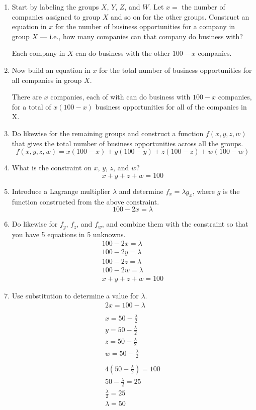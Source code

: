 \documentclass[letterpaper,12pt,fleqn]{article}
\renewcommand{\l}{\lambda}
\begin{document}
\begin{enumerate}[label={\alph*)}]
\item Start by labeling the groups \(X\), \(Y\), \(Z\), and \(W\).  Let \(x=\) the number of companies assigned to
  group \(X\) and so on for the other groups.  Construct an equation in \(x\) for the number of business
  opportunities for a company in group \(X\) --- i.e., how many companies can that company do business with?

  Each company in \(X\) can do business with the other \(100-x\) companies.
  
\item Now build an equation in \(x\) for the total number of business opportunities for all companies in group
  \(X\).

  There are \(x\) companies, each of with can do business with \(100-x\) companies, for a total of \(x(100-x)\)
  business opportunities for all of the companies in X.

\item Do likewise for the remaining groups and construct a function \(f(x,y,z,w)\) that gives the total number of
  business opportunities across all the groups.
  \[f(x,y,z,w)=x(100-x)+y(100-y)+z(100-z)+w(100-w)\]
  
\item What is the constraint on \(x\), \(y\), \(z\), and \(w\)?
  \[x+y+z+w=100\]

\item Introduce a Lagrange multiplier \(\l\) and determine \(f_x=\l g_x\), where \(g\) is the function constructed
  from the above constraint.
  \[100-2x=\l\]

\item Do likewise for \(f_y\), \(f_z\), and \(f_w\), and combine them with the constraint so that you have 5
  equations in 5 unknowns.
  \begin{gather*}
    100-2x=\l \\
    100-2y=\l \\
    100-2z=\l \\
    100-2w=\l \\
    x+y+z+w=100
  \end{gather*}

\item Use substitution to determine a value for \(\l\).
  \begin{gather*}
    2x=100-\l \\
    \\
    x=50-\frac{\l}{2} \\
    y=50-\frac{\l}{2} \\
    z=50-\frac{\l}{2} \\
    w=50-\frac{\l}{2} \\
    \\
    4\left(50-\frac{\l}{2}\right)=100 \\
    50-\frac{\l}{2}=25 \\
    \frac{\l}{2}=25 \\
    \l=50
  \end{gather*}


\end{enumerate}
\end{document}
